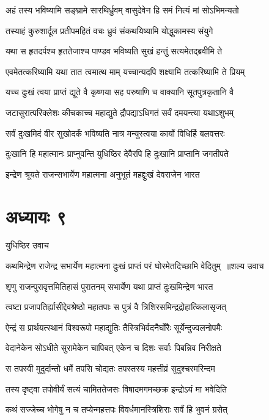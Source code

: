 \twolineshloka
{अहं तस्य भविष्यामि सङ्घ्रामे सारथिर्ध्रुवम्}
{वासुदेवेन हि समं नित्यं मां सोऽभिमन्यतो}


\twolineshloka
{तस्याहं कुरुशार्दूल प्रतीपमहितं वचः}
{ध्रुवं संकथयिष्यामि योद्धुकामस्य संयुगे}


\twolineshloka
{यथा स हृतदर्पश्च हृततेजाश्च पाण्डव}
{भविष्यति सुखं हन्तुं सत्यमेतद्ब्रवीमि ते}


\twolineshloka
{एवमेतत्करिष्यामि यथा तात त्वमात्थ माम्}
{यच्चान्यदपि शक्ष्यामि तत्करिष्यामि ते प्रियम्}


\twolineshloka
{यच्च दुःखं त्वया प्राप्तं द्यूते वै कृष्णया सह}
{परुषाणि च वाक्यानि सूतपुत्रकृतानि वै}


\twolineshloka
{जटासुरात्परिक्लेशः कीचकाच्च महाद्युते}
{द्रौपद्याऽधिगतं सर्वं दमयन्त्या यथाऽशुभम्}


\twolineshloka
{सर्वं दुःखमिदं वीर सुखोदर्कं भविष्यति}
{नात्र मन्युस्त्वया कार्यो विधिर्हि बलवत्तरः}


\twolineshloka
{दुःखानि हि महात्मानः प्राप्नुवन्ति युधिष्ठिर}
{देवैरपि हि दुःखानि प्राप्तानि जगतीपते}


\twolineshloka
{इन्द्रेण श्रूयते राजन्सभार्येण महात्मना}
{अनुभूतं महद्दुःखं देवराजेन भारत}


\chapter{अध्यायः ९}
\twolineshloka
{युधिष्ठिर उवाच}
{}


\threelineshloka
{कथमिन्द्रेण राजेन्द्र सभार्येण महात्मना}
{दुःखं प्राप्तं परं घोरमेतदिच्छामि वेदितुम् ॥शल्य उवाच}
{}


\twolineshloka
{शृणु राजन्पुरावृत्तमितिहासं पुरातनम्}
{सभार्येण यथा प्राप्तं दुःखमिन्द्रेण भारत}


\twolineshloka
{त्वष्टा प्रजापतिर्ह्यासीद्देवश्रेष्ठो महातपाः}
{स पुत्रं वै त्रिशिरसमिन्द्रद्रोहात्किलासृजत्}


\twolineshloka
{ऐन्द्रं स प्रार्थयत्स्थानं विश्वरूपो महाद्युतिः}
{तैस्त्रिभिर्वदनैर्घोरैः सूर्येन्दुज्वलनोपमैः}


\twolineshloka
{वेदानेकेन सोऽधीते सुरामेकेन चापिबत्}
{एकेन च दिशः सर्वाः पिबन्निव निरीक्षते}


\twolineshloka
{स तपस्वी मुदुर्दान्तो धर्मे तपसि चोद्यतः}
{तपस्तस्य महत्तीव्रं सुदुश्चरमरिन्दम}


\twolineshloka
{तस्य दृष्ट्वा तपोवीर्यं सत्यं चामिततेजसः}
{विषादमगमच्छक्र इन्द्रोऽयं मा भवेदिति}


\twolineshloka
{कथं सज्जेच्च भोगेषु न च तप्येन्महत्तपः}
{विवर्धमानस्त्रिशिराः सर्वं हि भुवनं ग्रसेत्}


